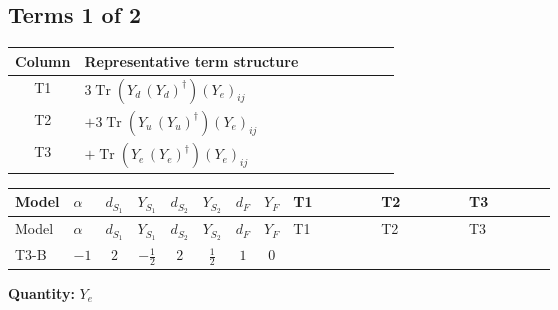 \documentclass[8pt]{article}
\begin{document}
\begin{landscape}
\subsection*{Terms 1 of 2}
\begin{center}
\begin{tabular}{@{}c >{\raggedright\arraybackslash}p{0.82\linewidth}@{}}
\toprule
Column & Representative term structure \\
\midrule
T1 & \(\displaystyle 3 \operatorname{Tr}\!\left({Y_d}\,\left({Y_d}\right)^{\dagger}\right) \left({Y_e}\right)_{ij}\) \\
\midrule
T2 & \(\displaystyle +3 \operatorname{Tr}\!\left({Y_u}\,\left({Y_u}\right)^{\dagger}\right) \left({Y_e}\right)_{ij}\) \\
\midrule
T3 & \(\displaystyle +\operatorname{Tr}\!\left({Y_e}\,\left({Y_e}\right)^{\dagger}\right) \left({Y_e}\right)_{ij}\) \\
\midrule
\bottomrule
\end{tabular}
\end{center}
\smallskip
\tiny
\begin{longtable}{@{}llcccccc >{\raggedright\arraybackslash}p{0.21\linewidth} >{\raggedright\arraybackslash}p{0.21\linewidth} >{\raggedright\arraybackslash}p{0.21\linewidth}@{}}
\toprule
Model & $\alpha$ & $d_{S_1}$ & $Y_{S_1}$ & $d_{S_2}$ & $Y_{S_2}$ & $d_F$ & $Y_F$ & T1 & T2 & T3 \\
\midrule
\endfirsthead
\toprule
Model & $\alpha$ & $d_{S_1}$ & $Y_{S_1}$ & $d_{S_2}$ & $Y_{S_2}$ & $d_F$ & $Y_F$ & T1 & T2 & T3 \\
\midrule
\endhead
T3-B & $-1$ & $2$ & $-\frac{1}{2}$ & $2$ & $\frac{1}{2}$ & $1$ & $0$ & \scriptsize\adjustbox{max width=\linewidth}{$\begin{gathered} 3 \operatorname{Tr}\!\left({Y_d}\,\left({Y_d}\right)^{\dagger}\right) \left({Y_e}\right)_{ij}\end{gathered}$} & \scriptsize\adjustbox{max width=\linewidth}{$\begin{gathered} +3 \operatorname{Tr}\!\left({Y_u}\,\left({Y_u}\right)^{\dagger}\right) \left({Y_e}\right)_{ij}\end{gathered}$} & \scriptsize\adjustbox{max width=\linewidth}{$\begin{gathered} +\operatorname{Tr}\!\left({Y_e}\,\left({Y_e}\right)^{\dagger}\right) \left({Y_e}\right)_{ij}\end{gathered}$} \\
\midrule
\bottomrule
\end{longtable}
\clearpage
\noindent\textbf{Quantity: }$Y_e$\par\smallskip

\end{landscape}
\end{document}
